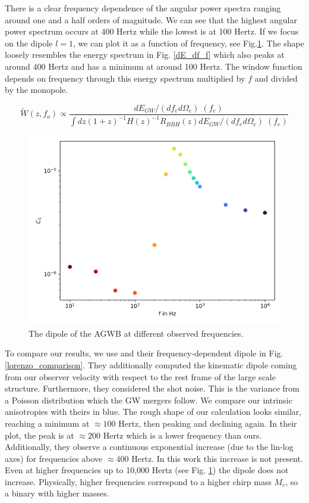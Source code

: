 There is a clear frequency dependence of the angular power spectra ranging around one and a half orders of magnitude. We can see that the highest angular power spectrum occurs at 400 Hertz while the lowest is at 100 Hertz. If we focus on the dipole $l=1$, we can plot it as a function of frequency, see Fig.\ref{dipole_1000Hz}. The shape loosely resembles the energy spectrum in Fig. \ref{dE_df_f} which also peaks at around 400 Hertz and has a minimum at around 100 Hertz. The window function depends on frequency through this energy spectrum multiplied by $f$ and divided by the monopole.

\begin{equation}
    \tilde{W}(z, f_o)\propto \frac{dE_{GW}/(df_e d\Omega_e)\;(f_e)}{\int dz (1+z)^{-1}H(z)^{-1}R_{BBH}(z) dE_{GW}/(df_e d\Omega_e)\;(f_e)}
\end{equation}

\begin{figure}
    \centering
    \includegraphics[width=0.8\linewidth]{Images/dipole_frequencies_10000Hz.png}
    \caption{The dipole of the AGWB at different observed frequencies.}
    \label{dipole_1000Hz}
\end{figure} 

To compare our results, we use \cite{dallarmi_dipole_2022} and their frequency-dependent dipole in Fig. \ref{lorenzo_comparison}. They additionally computed the kinematic dipole coming from our observer velocity with respect to the rest frame of the large scale structure. Furthermore, they considered the shot noise. This is the variance from a Poisson distribution which the GW mergers follow. We compare our intrinsic anisotropies with theirs in blue. The rough shape of our calculation looks similar, reaching a minimum at $\approx 100$ Hertz, then peaking and declining again. In their plot, the peak is at $\approx 200$ Hertz which is a lower frequency than ours. Additionally, they observe a continuous exponential increase (due to the lin-log axes) for frequencies above $\approx 400$ Hertz. In this work this increase is not present. Even at higher frequencies up to 10,000 Hertz (see Fig. \ref{dipole_1000Hz}) the dipole does not increase. Physically, higher frequencies correspond to a higher chirp mass $M_c$, so a binary with higher masses.

